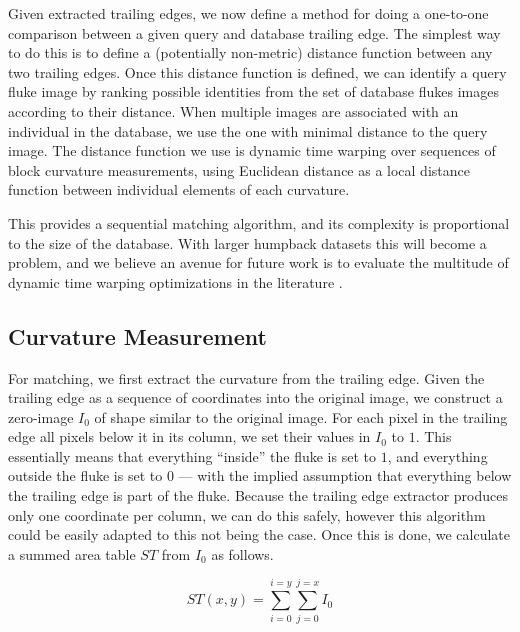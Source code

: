 Given extracted trailing edges, we now define a method for doing a one-to-one comparison between a given query and database trailing edge.
The simplest way to do this is to define a (potentially non-metric) distance function between any two trailing edges.
Once this distance function is defined, we can identify a query fluke image by ranking possible identities from the set of database flukes images according to their distance.
When multiple images are associated with an individual in the database, we use the one with minimal distance to the query image.
The distance function we use is dynamic time warping over sequences of block curvature measurements, using Euclidean distance as a local distance function between individual elements of each curvature.

This provides a sequential matching algorithm, and its complexity is proportional to the size of the database.
With larger humpback datasets this will become a problem, and we believe an avenue for future work is to evaluate the multitude of dynamic time warping optimizations in the literature \cite{rakthanmanon2012searching, salvador2007fastdtw, lemire2009faster}. 

\subsection{Curvature Measurement}

For matching, we first extract the curvature from the trailing edge.
Given the trailing edge as a sequence of coordinates into the original image, we construct a zero-image $I_0$ of shape similar to the original image.
For each pixel in the trailing edge all pixels below it in its column, we set their values in $I_0$ to $1$.
This essentially means that everything ``inside'' the fluke is set to $1$, and everything outside the fluke is set to $0$ --- with the implied assumption that everything below the trailing edge is part of the fluke.
Because the trailing edge extractor produces only one coordinate per column, we can do this safely, however this algorithm could be easily adapted to this not being the case.
Once this is done, we calculate a summed area table \cite{crow1984summed} $ST$ from $I_0$ as follows.

\begin{equation} \label{eqn:sat}
ST(x,y) = \sum_{i=0}^{i=y}\sum_{j=0}^{j=x} I_0 
\end{equation}

